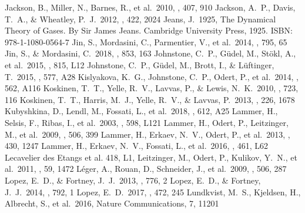 \documentclass{aa}
\begin{document}
\begin{thebibliography}{}
    Jackson, B., Miller, N., Barnes, R., et al.\ 2010, \mnras, 407, 910
    Jackson, A.~P., Davis, T.~A., \& Wheatley, P.~J.\ 2012, \mnras, 422,            2024
    Jeans, J.\ 1925, The Dynamical Theory of Gases. By Sir James Jeans.             Cambridge University Press, 1925. ISBN: 978-1-1080-0564-7
    Jin, S., Mordasini, C., Parmentier, V., et al.\ 2014, \apj, 795, 65
    Jin, S., \& Mordasini, C.\ 2018, \apj, 853, 163
    Johnstone, C.~P., G{\"u}del, M., St{\"o}kl, A., et al.\ 2015, \apjl, 815, L12
    Johnstone, C.~P., G{\"u}del, M., Brott, I., \& L{\"u}ftinger, T.\ 2015, \aap, 577, A28
    Kislyakova, K.~G., Johnstone, C.~P., Odert, P., et al.\ 2014, \aap, 562,    A116
    Koskinen, T.~T., Yelle, R.~V., Lavvas, P., \& Lewis, N.~K.\ 2010, \apj,         723, 116
    Koskinen, T.~T., Harris, M.~J., Yelle, R.~V., \& Lavvas, P.\ 2013, \icarus, 226, 1678
    Kubyshkina, D., Lendl, M., Fossati, L., et al.\ 2018, \aap, 612, A25
    Lammer, H., Selsis, F., Ribas, I., et al.\ 2003, \apjl, 598, L121
    Lammer, H., Odert, P., Leitzinger, M., et al.\ 2009, \aap, 506, 399
    Lammer, H., Erkaev, N.~V., Odert, P., et al.\ 2013, \mnras, 430, 1247
    Lammer, H., Erkaev, N.~V., Fossati, L., et al.\ 2016, \mnras, 461, L62
    Lecavelier des Etangs et al.  418, L1, 
    Leitzinger, M., Odert, P., Kulikov, Y.~N., et al.\ 2011, \planss, 59, 1472
    L{\'e}ger, A., Rouan, D., Schneider, J., et al.\ 2009, \aap, 506, 287
    Lopez, E.~D., \& Fortney, J.~J.\ 2013, \apj, 776, 2
    Lopez, E.~D., \& Fortney, J.~J.\ 2014, \apj, 792, 1
    Lopez, E.~D.\ 2017, \mnras, 472, 245
    Lundkvist, M.~S., Kjeldsen, H., Albrecht, S., et al.\ 2016, Nature          Communications, 7, 11201

\end{thebibliography}
\end{document}
